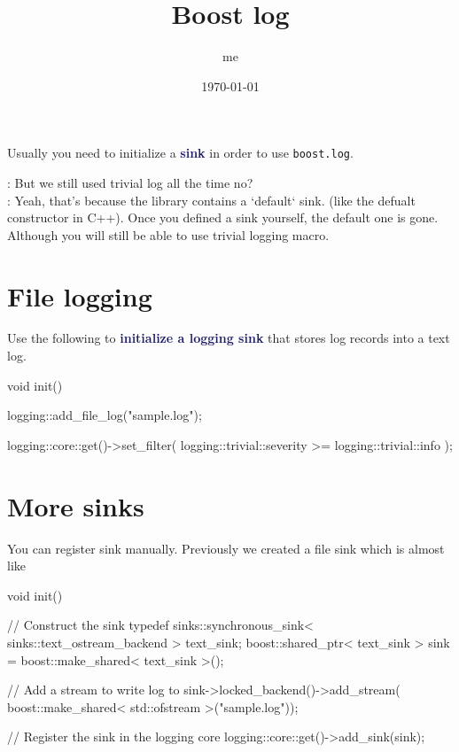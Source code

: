 \documentclass[dvipsnames]{article}
\title{Boost log}
\date{\today}
\author{me}
\newcommand{\mycola}{MidnightBlue}
\newcommand{\Cola}[1]{\textcolor{\mycola}{\textbf{#1}}}
\begin{document}
\maketitle


Usually you need to initialize a \Cola{sink} in order to use \texttt{boost.log}.

\begin{tcolorbox}
    : But we still used trivial log all the time no? \\
   : Yeah, that's because the library contains a `default` sink.
  (like the defualt constructor in C++).
  Once you defined a sink yourself, the default one is gone. Although you will
  still be able to use trivial logging macro.
\end{tcolorbox}

\section{File logging}

Use the following to \Cola{initialize a logging sink} that stores log records into a text log.
\begin{simplec}
  void init(){
    logging::add_file_log("sample.log");

    logging::core::get()->set_filter(
    logging::trivial::severity >= logging::trivial::info
    );
  }
\end{simplec}

\section{More sinks}

You can register sink manually. Previously we created a file sink which is almost like
\begin{simplec}
  void init()
  {
    // Construct the sink
    typedef sinks::synchronous_sink< sinks::text_ostream_backend > text_sink;
    boost::shared_ptr< text_sink > sink = boost::make_shared< text_sink >();

    // Add a stream to write log to
    sink->locked_backend()->add_stream(
    boost::make_shared< std::ofstream >("sample.log"));

    // Register the sink in the logging core
    logging::core::get()->add_sink(sink);
  }
\end{simplec}
\end{document}
